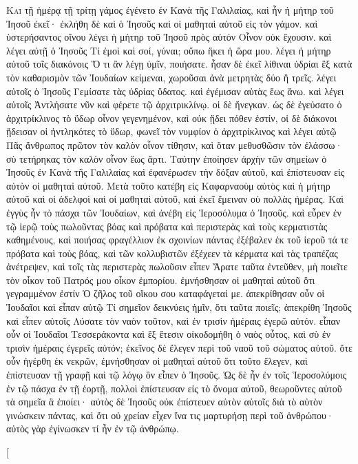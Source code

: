 \begin{pages}
    \begin{Rightside}
        \beginnumbering
		\renewcommand{\LettrineFontHook}{\PHtitl}
		\lettrine[lines=3]{Κ}{αὶ} τῇ ἡμέρᾳ τῇ τρίτῃ γάμος ἐγένετο ἐν Κανὰ τῆς Γαλιλαίας, καὶ ἦν ἡ μήτηρ τοῦ Ἰησοῦ ἐκεῖ· ἐκλήθη δὲ καὶ ὁ Ἰησοῦς καὶ οἱ μαθηταὶ αὐτοῦ εἰς τὸν γάμον. καὶ ὑστερήσαντος οἴνου λέγει ἡ μήτηρ τοῦ Ἰησοῦ πρὸς αὐτόν Οἶνον οὐκ ἔχουσιν. καὶ λέγει αὐτῇ ὁ Ἰησοῦς Τί ἐμοὶ καὶ σοί, γύναι; οὔπω ἥκει ἡ ὥρα μου. λέγει ἡ μήτηρ αὐτοῦ τοῖς διακόνοις Ὅ τι ἂν λέγῃ ὑμῖν, ποιήσατε. ἦσαν δὲ ἐκεῖ λίθιναι ὑδρίαι ἓξ κατὰ τὸν καθαρισμὸν τῶν Ἰουδαίων κείμεναι, χωροῦσαι ἀνὰ μετρητὰς δύο ἢ τρεῖς. λέγει αὐτοῖς ὁ Ἰησοῦς Γεμίσατε τὰς ὑδρίας ὕδατος. καὶ ἐγέμισαν αὐτὰς ἕως ἄνω. καὶ λέγει αὐτοῖς Ἀντλήσατε νῦν καὶ φέρετε τῷ ἀρχιτρικλίνῳ. οἱ δὲ ἤνεγκαν. ὡς δὲ ἐγεύσατο ὁ ἀρχιτρίκλινος τὸ ὕδωρ οἶνον γεγενημένον, καὶ οὐκ ᾔδει πόθεν ἐστίν, οἱ δὲ διάκονοι ᾔδεισαν οἱ ἠντληκότες τὸ ὕδωρ, φωνεῖ τὸν νυμφίον ὁ ἀρχιτρίκλινος καὶ λέγει αὐτῷ Πᾶς ἄνθρωπος πρῶτον τὸν καλὸν οἶνον τίθησιν, καὶ ὅταν μεθυσθῶσιν τὸν ἐλάσσω· σὺ τετήρηκας τὸν καλὸν οἶνον ἕως ἄρτι. Ταύτην ἐποίησεν ἀρχὴν τῶν σημείων ὁ Ἰησοῦς ἐν Κανὰ τῆς Γαλιλαίας καὶ ἐφανέρωσεν τὴν δόξαν αὐτοῦ, καὶ ἐπίστευσαν εἰς αὐτὸν οἱ μαθηταὶ αὐτοῦ.
		\pend
		\pstart
		Μετὰ τοῦτο κατέβη εἰς Καφαρναοὺμ αὐτὸς καὶ ἡ μήτηρ αὐτοῦ καὶ οἱ ἀδελφοὶ καὶ οἱ μαθηταὶ αὐτοῦ, καὶ ἐκεῖ ἔμειναν οὐ πολλὰς ἡμέρας. Καὶ ἐγγὺς ἦν τὸ πάσχα τῶν Ἰουδαίων, καὶ ἀνέβη εἰς Ἱεροσόλυμα ὁ Ἰησοῦς. καὶ εὗρεν ἐν τῷ ἱερῷ τοὺς πωλοῦντας βόας καὶ πρόβατα καὶ περιστερὰς καὶ τοὺς κερματιστὰς καθημένους, καὶ ποιήσας φραγέλλιον ἐκ σχοινίων πάντας ἐξέβαλεν ἐκ τοῦ ἱεροῦ τά τε πρόβατα καὶ τοὺς βόας, καὶ τῶν κολλυβιστῶν ἐξέχεεν τὰ κέρματα καὶ τὰς τραπέζας ἀνέτρεψεν, καὶ τοῖς τὰς περιστερὰς πωλοῦσιν εἶπεν Ἄρατε ταῦτα ἐντεῦθεν, μὴ ποιεῖτε τὸν οἶκον τοῦ Πατρός μου οἶκον ἐμπορίου. ἐμνήσθησαν οἱ μαθηταὶ αὐτοῦ ὅτι γεγραμμένον ἐστίν Ὁ ζῆλος τοῦ οἴκου σου καταφάγεταί με. 
		\pend
		\pstart
		ἀπεκρίθησαν οὖν οἱ Ἰουδαῖοι καὶ εἶπαν αὐτῷ Τί σημεῖον δεικνύεις ἡμῖν, ὅτι ταῦτα ποιεῖς; ἀπεκρίθη Ἰησοῦς καὶ εἶπεν αὐτοῖς Λύσατε τὸν ναὸν τοῦτον, καὶ ἐν τρισὶν ἡμέραις ἐγερῶ αὐτόν. εἶπαν οὖν οἱ Ἰουδαῖοι Τεσσεράκοντα καὶ ἓξ ἔτεσιν οἰκοδομήθη ὁ ναὸς οὗτος, καὶ σὺ ἐν τρισὶν ἡμέραις ἐγερεῖς αὐτόν; ἐκεῖνος δὲ ἔλεγεν περὶ τοῦ ναοῦ τοῦ σώματος αὐτοῦ. ὅτε οὖν ἠγέρθη ἐκ νεκρῶν, ἐμνήσθησαν οἱ μαθηταὶ αὐτοῦ ὅτι τοῦτο ἔλεγεν, καὶ ἐπίστευσαν τῇ γραφῇ καὶ τῷ λόγῳ ὃν εἶπεν ὁ Ἰησοῦς. Ὡς δὲ ἦν ἐν τοῖς Ἱεροσολύμοις ἐν τῷ πάσχα ἐν τῇ ἑορτῇ, πολλοὶ ἐπίστευσαν εἰς τὸ ὄνομα αὐτοῦ, θεωροῦντες αὐτοῦ τὰ σημεῖα ἃ ἐποίει· αὐτὸς δὲ Ἰησοῦς οὐκ ἐπίστευεν αὑτὸν αὐτοῖς διὰ τὸ αὐτὸν γινώσκειν πάντας, καὶ ὅτι οὐ χρείαν εἶχεν ἵνα τις μαρτυρήσῃ περὶ τοῦ ἀνθρώπου· αὐτὸς γὰρ ἐγίνωσκεν τί ἦν ἐν τῷ ἀνθρώπῳ.
		\pend
        \endnumbering
    \end{Rightside}
    \begin{Leftside}
        \beginnumbering
        \pstart[

\end{Leftside}
\end{pages}
